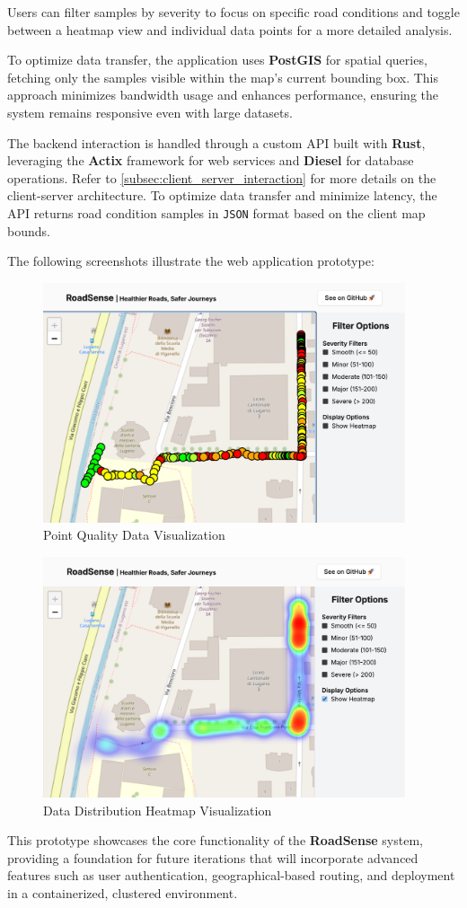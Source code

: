 \noindent Users can filter samples by severity to focus on specific road conditions and toggle between a heatmap view and individual data points for a more detailed analysis.

To optimize data transfer, the application uses \textbf{PostGIS} for spatial queries, fetching only the samples visible within the map's current bounding box. This approach minimizes bandwidth usage and enhances performance, ensuring the system remains responsive even with large datasets.

The backend interaction is handled through a custom API built with \textbf{Rust}, leveraging the \textbf{Actix} framework for web services and \textbf{Diesel} for database operations. Refer to \autoref{subsec:client_server_interaction} for more details on the client-server architecture. To optimize data transfer and minimize latency, the API returns road condition samples in \texttt{JSON} format based on the client map bounds. 

The following screenshots illustrate the web application prototype:

\begin{figure}[H]
	\centering
	\includegraphics[width=0.95\textwidth]{../../assets/images/roadsense_webapp_points.png}
	\caption{Point Quality Data Visualization}
	\label{fig:point_quality_data}
\end{figure}

\begin{figure}[H]
	\centering
	\includegraphics[width=0.95\textwidth]{../../assets/images/roadsense_webapp_heat.png}
	\caption{Data Distribution Heatmap Visualization}
	\label{fig:data_distribution_heatmap}
\end{figure}


\noindent This prototype showcases the core functionality of the \textbf{RoadSense} system, providing a foundation for future iterations that will incorporate advanced features such as user authentication, geographical-based routing, and deployment in a containerized, clustered environment.
